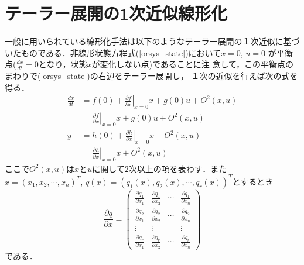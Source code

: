 \section{テーラー展開の1次近似線形化}
一般に用いられている線形化手法は以下のようなテーラー展開の１次近似に基づ
いたものである．非線形状態方程式(\ref{orsys_state})において$x=0$, $u=0$
が平衡点($\frac{dx}{dt} = 0$となり，状態$x$が変化しない点)であることに注
意して，この平衡点のまわりで(\ref{orsys_state})の右辺をテーラー展開し，
１次の近似を行えば次の式を得る．
\begin{align}
 \frac{dx}{dt} 
 &= f(0) + \left. \frac{\partial f}{\partial x} \right \vert _{x=0} x
 + g(0) u + O^2 (x, u) \nonumber \\
 &= \left. \frac{\partial f}{\partial x} \right \vert _{x=0} x
 + g(0) u + O^2 (x, u)
 \label{app1_state_p}
\\
 y 
 &= h(0) + \left. \frac{\partial h}{\partial x} \right \vert _{x=0} x
 + O^2 (x, u)
 \nonumber \\
 &= \left. \frac{\partial h}{\partial x} \right \vert _{x=0} x
 + O^2 (x, u)
\end{align}
ここで$O^2(x, u)$は$x$と$u$に関して2次以上の項を表わす．また
$x = (x_1, x_2, \cdots, x_n)^T$, $q(x) = (q_1(x), q_2(x), \cdots,
q_r(x))^T$とするとき
\begin{equation}
 \frac{\partial q}{\partial x} = 
  \left(\begin{array}{cccc}
   \frac{\partial q_1}{\partial x_1} &
    \frac{\partial q_1}{\partial x_2} &
    \cdots &
    \frac{\partial q_1}{\partial x_n} \\
	 \frac{\partial q_2}{\partial x_1} &
	  \frac{\partial q_2}{\partial x_2} &
	  \cdots &
	  \frac{\partial q_2}{\partial x_n} \\
	 \vdots & \vdots & & \vdots \\
	 \frac{\partial q_r}{\partial x_1} &
	  \frac{\partial q_r}{\partial x_2} &
	  \cdots &
	  \frac{\partial q_r}{\partial x_n}
	\end{array}\right)
\end{equation}
である．%
